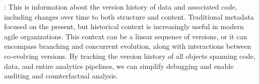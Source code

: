 \documentclass{sig-alternate}
\begin{document}
:
This is information about the version history of data and associated code, including changes over time to both structure and content. 
Traditional metadata focused on the present, but historical context is increasingly useful in modern agile organizations.
This context can be a linear sequence of versions, or it can encompass branching and concurrent evolution, along with interactions 
between co-evolving versions.
By tracking the version history of all objects spanning code, data, and entire analytics pipelines, we can simplify debugging and enable auditing and counterfactual analysis. %



\end{document}
